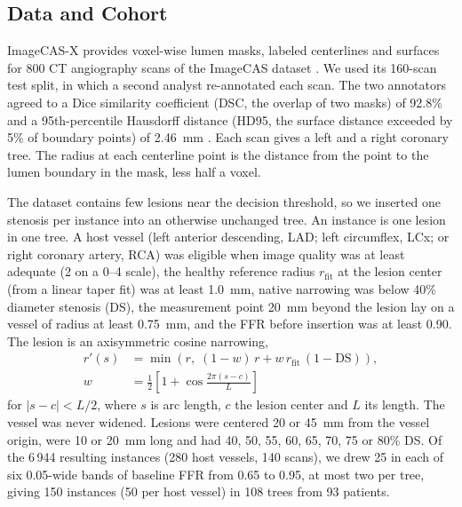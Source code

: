 \documentclass[journal]{IEEEtran}
\begin{document}
\subsection{Data and Cohort}
ImageCAS-X provides voxel-wise lumen masks, labeled centerlines and surfaces for 800 CT angiography scans of the
ImageCAS dataset \cite{zeng2023,bransby2026,imagecasx_data}. We used its 160-scan test split, in which a second
analyst re-annotated each scan. The two annotators agreed to a Dice similarity coefficient (DSC, the overlap of two
masks) of 92.8\% and a 95th-percentile Hausdorff distance (HD95, the surface distance exceeded by 5\% of boundary
points) of 2.46~mm \cite{bransby2026}. Each scan gives a left and a right coronary tree. The radius at each centerline point is the distance from the point to the
lumen boundary in the mask, less half a voxel.

The dataset contains few lesions near the decision threshold, so we inserted one stenosis per instance into an
otherwise unchanged tree. An instance is one lesion in one tree. A host vessel (left anterior descending, LAD; left circumflex, LCx; or right coronary artery, RCA) was eligible
when image quality was at least adequate (2 on a 0--4 scale), the healthy reference radius $r_\mathrm{fit}$ at the
lesion center (from a linear taper fit) was at least 1.0~mm, native narrowing was below 40\% diameter stenosis (DS),
the measurement point 20~mm beyond the lesion lay on a vessel of radius at least 0.75~mm, and the FFR before
insertion was at least 0.90. The lesion is an axisymmetric cosine narrowing,
\begin{equation}
\begin{aligned}
r'(s) &= \min\!\left(r,\; (1-w)\,r + w\,r_\mathrm{fit}\,(1-\mathrm{DS})\right),\\
w &= \tfrac{1}{2}\left[1+\cos\tfrac{2\pi (s-c)}{L}\right]
\end{aligned}
\end{equation}
for $|s-c|<L/2$, where $s$ is arc length, $c$ the lesion center and $L$ its length. The vessel was never widened.
Lesions were centered 20 or 45~mm from the vessel origin, were 10 or 20~mm long and had 40, 50, 55, 60, 65, 70, 75
or 80\% DS. Of the 6\,944 resulting instances (280 host vessels, 140 scans), we drew 25 in each of six 0.05-wide bands of
baseline FFR from 0.65 to 0.95, at most two per tree, giving 150 instances (50 per host vessel) in 108 trees from 93
patients.
\end{document}
